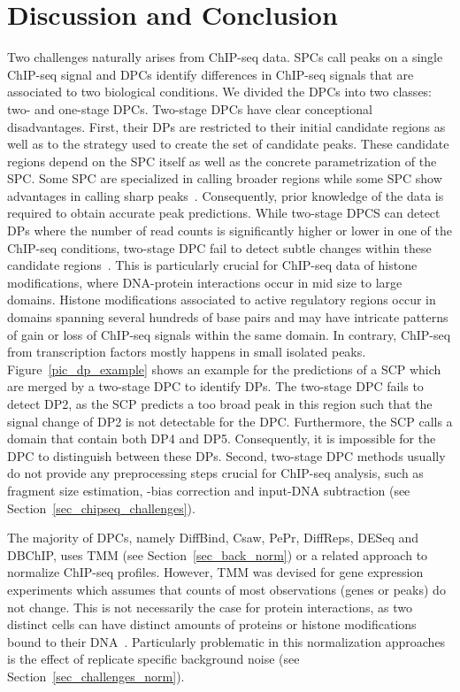 \section{Discussion and Conclusion}
Two challenges naturally arises from ChIP-seq data.
SPCs call peaks on a single ChIP-seq signal and DPCs identify differences in ChIP-seq signals that are associated to two biological conditions.
We divided  the DPCs into two classes: two- and one-stage DPCs.
Two-stage DPCs have clear conceptional disadvantages.
First, their DPs are restricted to their initial candidate regions as well as to the strategy used to create the set of candidate peaks.
These candidate regions depend on the SPC itself as well as the concrete parametrization of the SPC.
Some SPC are specialized in calling broader regions while some SPC show advantages in calling sharp peaks~\citep{wilbanks2010}.
Consequently, prior knowledge of the data is required to obtain accurate peak predictions.
While two-stage DPCS can detect DPs where the number of read counts is significantly higher or lower in one of the ChIP-seq conditions, two-stage DPC fail to detect subtle changes within these candidate regions~\citep{Allhoff2014, Maze2014}. 
This is particularly crucial for ChIP-seq data of histone modifications, where DNA-protein interactions occur in mid size to large domains.
Histone modifications associated to active regulatory regions occur in domains spanning several hundreds of base pairs and may have intricate patterns of gain or loss of ChIP-seq signals within the same domain. 
In contrary, ChIP-seq from transcription factors mostly happens in small isolated peaks.
Figure~\ref{pic_dp_example} shows an example for the predictions of a SCP which are merged by a two-stage DPC to identify DPs.
The two-stage DPC fails to detect DP2, as the SCP predicts a too broad peak in this region such that the signal change of DP2 is not detectable for the DPC.
Furthermore, the SCP calls a domain that contain both DP4 and DP5.
Consequently, it is impossible for the DPC to distinguish between these DPs.
Second, two-stage DPC methods usually do not provide any preprocessing steps crucial for ChIP-seq analysis, such as fragment size estimation, -bias correction and input-DNA subtraction (see Section~\ref{sec_chipseq_challenges}). 

The majority of DPCs, namely DiffBind, Csaw, PePr, DiffReps, DESeq and DBChIP, uses TMM (see Section~\ref{sec_back_norm}) or a related approach to normalize ChIP-seq profiles.
However, TMM was devised for gene expression experiments which assumes that counts of most observations (genes or peaks) do not change.
This is not necessarily the case for protein interactions, as two distinct cells can have distinct amounts of proteins or histone modifications bound to their DNA~\citep{Meyer2014}. 
Particularly problematic in this normalization approaches is the effect of replicate specific background noise (see Section~\ref{sec_challenges_norm}). 

